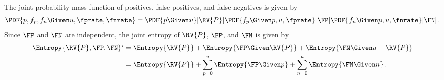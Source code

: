 \documentclass[ ../main.tex]{subfiles}
\begin{document}
The joint probability mass function of positives, false positives, and false negatives is given by
\begin{equation}
    \PDF{p, f_p, f_n \Given u, \fprate, \fnrate} = \PDF{p \Given u}[\RV{P}] \PDF{f_p \Given p, u, \fprate}[\FP] \PDF{f_n \Given p, u, \fnrate}[\FN]\,.
\end{equation}
Since $\FP$ and $\FN$ are independent, the joint entropy of $\RV{P}$, $\FP$, and $\FN$ is given by
\begin{align}
    \Entropy{\RV{P}, \FP, \FN}`
        &= \Entropy{\RV{P}} + \Entropy{\FP \Given \RV{P}} + \Entropy{\FN \Given u - \RV{P}}\\
        &= \Entropy{\RV{P}} + \sum_{p=0}^{u}\Entropy{\FP \Given p} + \sum_{n=0}^{u} \Entropy{\FN \Given n}\,.
\end{align}
\end{document}

